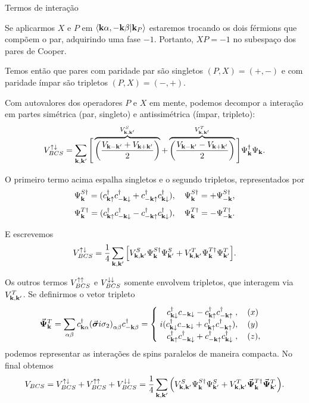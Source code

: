 \documentclass[a4paper,10pt]{article}
\begin{document}
\begin{section}{Termos de interação}
\n

Se aplicarmos $X$ e $P$ em $\braket{\vb{k}\alpha,-\vb{k}\beta}{\vb{k}_P}$ estaremos trocando os dois férmions que compõem o par, adquirindo uma fase $-1$. Portanto, $XP = -1$ no subespaço dos pares de Cooper.

\n

Temos então que pares com paridade par são singletos $(P,X) = (+, -)$ e com paridade ímpar são tripletos $(P,X) = (-,+)$.


Com autovalores dos operadores $P$ e $X$ em mente, podemos decompor a interação em partes simétrica (par, singleto) e antissimétrica (ímpar, tripleto):
$$
V_{BCS}^{\uparrow\downarrow} = \sum_{\vb{k},\vb{k}'}
\Bigg[
\overbrace{\qty(\frac{V_{\vb{k}-\vb{k}'} + V_{\vb{k}+\vb{k}'}}{2})}^{V_{\vb{k},\vb{k}'}^S} +
\overbrace{\qty(\frac{V_{\vb{k}-\vb{k}'} - V_{\vb{k}+\vb{k}'}}{2})}^{V_{\vb{k},\vb{k}'}^T}
\Bigg] \Psi_{\vb{k}}^\dagger \Psi_{\vb{k}}.
$$

O primeiro termo acima espalha singletos e o segundo tripletos, representados por
$$
\Psi_{\vb{k}}^{S\dagger} = (c_{\vb{k}\uparrow}^\dagger c_{-\vb{k}\downarrow}^\dagger + c_{-\vb{k}\uparrow}^\dagger c_{\vb{k}\downarrow}^\dagger),
\quad \Psi_{\vb{k}}^{S\dagger} = +\Psi_{-\vb{k}}^{S\dagger},
$$
$$
\Psi_{\vb{k}}^{T\dagger} = (c_{\vb{k}\uparrow}^\dagger c_{-\vb{k}\downarrow}^\dagger - c_{-\vb{k}\uparrow}^\dagger c_{\vb{k}\downarrow}^\dagger),
\quad \Psi_{\vb{k}}^{T\dagger} = -\Psi_{-\vb{k}}^{T\dagger}.
$$

E escrevemos
$$
V_{BCS}^{\uparrow\downarrow} =
\frac{1}{4} \sum_{\vb{k},\vb{k}'}
\qty[
V_{\vb{k},\vb{k}'}^S \Psi_{\vb{k}}^{S\dagger} \Psi_{\vb{k}'}^{S} +
V_{\vb{k},\vb{k}'}^T \Psi_{\vb{k}}^{T\dagger} \Psi_{\vb{k}'}^{T}
].
$$


Os outros termos $V_{BCS}^{\uparrow\uparrow}$ e $V_{BCS}^{\downarrow\downarrow}$ somente envolvem tripletos, que interagem via $V_{\vb{k},\vb{k}'}^T$. Se definirmos o vetor tripleto
$$
\va*{\Psi}_{\vb{k}}^T = \sum_{\alpha\beta} c_{\vb{k}\alpha}^\dagger \qty(\va*{\sigma} i \sigma_2)_{\alpha\beta} c_{-\vb{k}\beta}^\dagger =
\begin{cases}
\; \; \; \; c_{\vb{k}\downarrow}^\dagger c_{-\vb{k}\downarrow} - c_{\vb{k}\uparrow}^\dagger c_{-\vb{k}\uparrow}^\dagger \; , \quad (x) \\
\; i (c_{\vb{k}\downarrow}^\dagger c_{-\vb{k}\downarrow} + c_{\vb{k}\uparrow}^\dagger c_{-\vb{k}\uparrow}^\dagger), \quad (y) \\
\; \; \; \; c_{\vb{k}\uparrow}^\dagger c_{-\vb{k}\downarrow}^\dagger + c_{-\vb{k}\uparrow}^\dagger c_{\vb{k}\downarrow}^\dagger \; , \quad (z),
\end{cases}
$$
podemos representar as interações de spins paralelos de maneira compacta. No final obtemos
$$
V_{BCS} =
V_{BCS}^{\uparrow\downarrow} + V_{BCS}^{\uparrow\uparrow} + V_{BCS}^{\downarrow\downarrow} =
\frac{1}{4} \sum_{\vb{k},\vb{k}'}
\qty(
V_{\vb{k},\vb{k}'}^S \Psi_{\vb{k}}^{S\dagger} \Psi_{\vb{k}'}^S +
V_{\vb{k},\vb{k}'}^T \va*{\Psi}_{\vb{k}}^{T\dagger} \va*{\Psi}_{\vb{k}'}^T
).
$$


\end{section}
\end{document}

